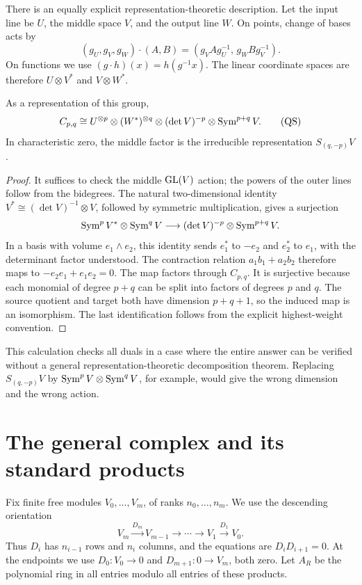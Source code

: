 There is an equally explicit representation-theoretic
description.  Let the input line be \(U\), the middle
space \(V\), and the output line \(W\).  On points,
change of bases acts by
\[
 (g_U,g_V,g_W)\cdot(A,B)
 =(g_VAg_U^{-1},\,g_WBg_V^{-1}).
\]
On functions we use \((g\cdot h)(x)=h(g^{-1}x)\).
The linear coordinate spaces are therefore
\(U\otimes V^*\) and \(V\otimes W^*\).

\begin{proposition}
As a representation of this group,
\[
 C_{p,q}\cong
 U^{\otimes p}\otimes(W^*)^{\otimes q}
       \otimes(\det V)^{-p}\otimes\operatorname{Sym}^{p+q}V.
 \tag{QS}
\]
In characteristic zero, the middle factor is the
irreducible representation \(S_{(q,-p)}V\).
\end{proposition}
\begin{proof}
It suffices to check the middle \(\operatorname{GL}(V)\) action;
the powers of the outer lines follow from the
bidegrees.  The natural two-dimensional identity
\(V^*\cong(\det V)^{-1}\otimes V\), followed by
symmetric multiplication, gives a surjection
\[
 \operatorname{Sym}^pV^*\otimes\operatorname{Sym}^qV
 \longrightarrow(\det V)^{-p}\otimes\operatorname{Sym}^{p+q}V.
\]
In a basis with volume \(e_1\wedge e_2\), this
identity sends \(e_1^*\) to \(-e_2\) and \(e_2^*\)
to \(e_1\), with the determinant factor understood.
The contraction relation \(a_1b_1+a_2b_2\)
therefore maps to \(-e_2e_1+e_1e_2=0\).
The map factors through \(C_{p,q}\).
It is surjective because each monomial of degree
\(p+q\) can be split into factors of degrees \(p\)
and \(q\).  The source quotient and target both
have dimension \(p+q+1\), so the induced map is an
isomorphism.  The last identification follows from
the explicit highest-weight convention.
\end{proof}

This calculation checks all duals in a case where
the entire answer can be verified without a
general representation-theoretic decomposition
theorem.  Replacing \(S_{(q,-p)}V\) by
\(\operatorname{Sym}^pV\otimes\operatorname{Sym}^qV\), for example, would
give the wrong dimension and the wrong action.

\section{The general complex and its standard products}

Fix finite free modules \(V_0,\ldots,V_m\), of
ranks \(n_0,\ldots,n_m\).  We use the descending
orientation
\[
 V_m\xrightarrow{D_m}V_{m-1}\longrightarrow
       \cdots\longrightarrow V_1\xrightarrow{D_1}V_0.
 \tag{C}
\]
Thus \(D_i\) has \(n_{i-1}\) rows and \(n_i\)
columns, and the equations are \(D_iD_{i+1}=0\).
At the endpoints we use \(D_0:V_0\to0\) and
\(D_{m+1}:0\to V_m\), both zero.
Let \(A_R\) be the polynomial ring in all entries
modulo all entries of these products.

